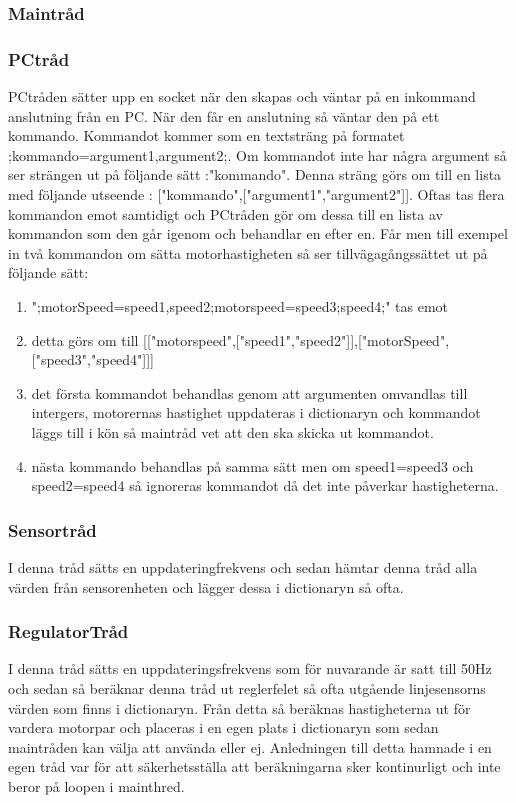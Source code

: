 \subsubsection{Maintråd}
\subsubsection{PCtråd}
PCtråden sätter upp en socket när den skapas och väntar på en inkommand anslutning från en PC. När den får en anslutning så väntar den på ett kommando. Kommandot kommer som en textsträng på formatet ;kommando=argument1,argument2;. Om kommandot inte har några argument så ser strängen ut på följande sätt :"kommando". Denna sträng görs om till en lista med följande utseende : ["kommando",["argument1","argument2"]].
\newline
\newline
Oftas tas flera kommandon emot samtidigt och PCtråden gör om dessa till en lista av kommandon som den går igenom och behandlar en efter en. Får men till exempel in två kommandon om sätta motorhastigheten så ser tillvägagångssättet ut på följande sätt:
\begin{enumerate}
\item ";motorSpeed=speed1,speed2;motorspeed=speed3;speed4;"  tas emot
\item detta görs om till [["motorspeed",["speed1","speed2"]],["motorSpeed",["speed3","speed4"]]]
\item det första kommandot behandlas genom att argumenten omvandlas till intergers, motorernas hastighet uppdateras i dictionaryn och kommandot läggs till i kön så maintråd vet att den ska skicka ut kommandot.
\item nästa kommando behandlas på samma sätt men om speed1=speed3 och speed2=speed4 så ignoreras kommandot då det inte påverkar hastigheterna.
\end{enumerate}
\subsubsection{Sensortråd}
I denna tråd sätts en uppdateringfrekvens och sedan hämtar denna tråd alla värden från sensorenheten och lägger dessa i dictionaryn så ofta.
\subsubsection{RegulatorTråd}
I denna tråd sätts en uppdateringsfrekvens som för nuvarande är satt till 50Hz och sedan så beräknar denna tråd ut reglerfelet så ofta utgående linjesensorns värden som finns i dictionaryn. Från detta så beräknas hastigheterna ut för vardera motorpar och placeras i en egen plats i dictionaryn som sedan maintråden kan välja att använda eller ej.
\newline
\newline
Anledningen till detta hamnade i en egen tråd var för att säkerhetsställa att beräkningarna sker kontinurligt och inte beror på loopen i mainthred.




